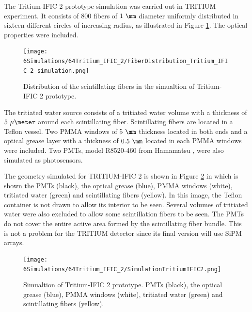 The Tritium-IFIC 2 prototype simulation was carried out in TRITIUM experiment. It consists of $800$ fibers of $1~\mm$ diameter uniformly distributed in sixteen different circles of increasing radius, as illustrated in Figure \ref{fig:FibersTritiumIFIC2Simulation}. The optical properties were included.

\begin{figure}[h]
\centering
\texttt{[image: 6Simulations/64Tritium\_IFIC\_2/FiberDistribution\_Tritium\_IFIC\_2\_simulation.png]}
\caption{Distribution of the scintillating fibers in the simualtion of Tritium-IFIC 2 prototype.\label{fig:FibersTritiumIFIC2Simulation}}
\end{figure}
The tritiated water source consists of a tritiated water volume with a thickness of $5~\mu\meter$ around each scintillating fiber. Scintillating fibers are located in a Teflon vessel. Two PMMA windows of $5~\mm$ thickness located in both ends and a optical grease layer with a thickness of $0.5~\mm$ located in each PMMA windows were included. Two PMTs, model R8520-460 from Hamamatsu \cite{DataSheetPMTs}, were also simulated as photosensors. 


The geometry simulated for TRITIUM-IFIC 2 is shown in Figure \ref{fig:TritiumIFIC2Simulation} in which is shown the PMTs (black), the optical grease (blue), PMMA windows (white), tritiated water (green) and scintillating fibers (yellow). In this image, the Teflon container is not drawn to allow its interior to be seen. Several volumes of tritiated water were also excluded to allow some scintillation fibers to be seen. The PMTs do not cover the entire active area formed by the scintillating fiber bundle. This is not a problem for the TRITIUM detector since its final version will use SiPM arrays.


\begin{figure}[h]
\centering
\texttt{[image: 6Simulations/64Tritium\_IFIC\_2/SimulationTritiumIFIC2.png]}
\caption{Simualtion of Tritium-IFIC 2 prototype. PMTs (black), the optical grease (blue), PMMA windows (white), tritiated water (green) and scintillating fibers (yellow). \label{fig:TritiumIFIC2Simulation}}
\end{figure}

